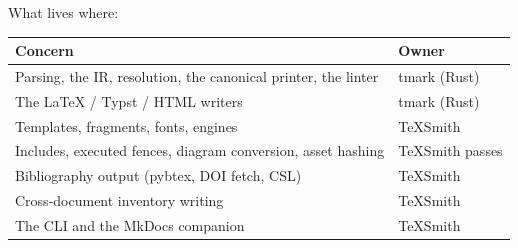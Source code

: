 \documentclass[a4paper,twoside]{article}
\begin{document}
What lives where:
\begin{center}
\begin{tabularx}{\linewidth}{>{\raggedright\arraybackslash}X>{\raggedright\arraybackslash}X}
\toprule
\textbf{Concern} & \textbf{Owner} \\
\midrule
Parsing, the IR, resolution, the canonical printer, the linter & tmark (Rust) \\
The \LaTeX{} / Typst / HTML writers & tmark (Rust) \\
Templates, fragments, fonts, engines & TeXSmith \\
Includes, executed fences, diagram conversion, asset hashing & TeXSmith passes \\
Bibliography output (pybtex, DOI fetch, CSL) & TeXSmith \\
Cross-document inventory writing & TeXSmith \\
The CLI and the MkDocs companion & TeXSmith \\
\bottomrule
\end{tabularx}
\end{center}
\end{document}
